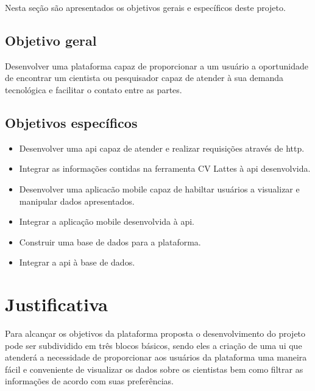 Nesta seção são apresentados os objetivos gerais e específicos deste projeto.

\subsection{Objetivo geral}\label{subsec:objetivoGeral}

Desenvolver uma plataforma capaz de proporcionar a um usuário a oportunidade de encontrar um cientista ou pesquisador capaz de atender à sua demanda tecnológica e facilitar o contato entre as partes.

\subsection{Objetivos específicos}\label{subsec:objetivosEspecificos}

\begin{itemize}
    \item Desenvolver uma \gls{api} capaz de atender e realizar requisições através de \gls{http}.
    \item Integrar as informações contidas na ferramenta CV Lattes à \gls{api} desenvolvida.
    \item Desenvolver uma aplicacão mobile capaz de habiltar usuários a visualizar e manipular dados apresentados.
    \item Integrar a aplicação mobile desenvolvida à \gls{api}.
    \item Construir uma base de dados para a plataforma.
    \item Integrar a \gls{api} à base de dados.
\end{itemize}

\section{Justificativa}\label{sec:justificativa}

Para alcançar os objetivos da plataforma proposta o desenvolvimento do projeto pode ser subdividido em três blocos básicos, sendo eles a criação de uma \gls{ui} que atenderá a necessidade de proporcionar aos usuários da plataforma uma maneira fácil e conveniente de visualizar os dados sobre os cientistas bem como filtrar as informações de acordo com suas preferências.

